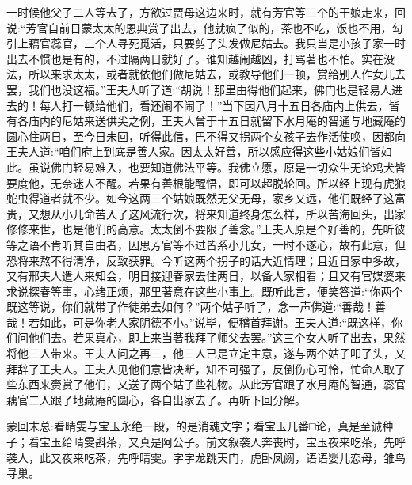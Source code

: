 \begin{parag}
    一时候他父子二人等去了，方欲过贾母这边来时，就有芳官等三个的干娘走来，回说:“芳官自前日蒙太太的恩典赏了出去，他就疯了似的，茶也不吃，饭也不用，勾引上藕官蕊官，三个人寻死觅活，只要剪了头发做尼姑去。我只当是小孩子家一时出去不惯也是有的，不过隔两日就好了。谁知越闹越凶，打骂著也不怕。实在没法，所以来求太太，或者就依他们做尼姑去，或教导他们一顿，赏给别人作女儿去罢，我们也没这福。”王夫人听了道:“胡说！那里由得他们起来，佛门也是轻易人进去的！每人打一顿给他们，看还闹不闹了！”当下因八月十五日各庙内上供去，皆有各庙内的尼姑来送供尖之例，王夫人曾于十五日就留下水月庵的智通与地藏庵的圆心住两日，至今日未回，听得此信，巴不得又拐两个女孩子去作活使唤，因都向王夫人道:“咱们府上到底是善人家。因太太好善，所以感应得这些小姑娘们皆如此。虽说佛门轻易难入，也要知道佛法平等。我佛立愿，原是一切众生无论鸡犬皆要度他，无奈迷人不醒。若果有善根能醒悟，即可以超脱轮回。所以经上现有虎狼蛇虫得道者就不少。如今这两三个姑娘既然无父无母，家乡又远，他们既经了这富贵，又想从小儿命苦入了这风流行次，将来知道终身怎么样，所以苦海回头，出家修修来世，也是他们的高意。太太倒不要限了善念。”王夫人原是个好善的，先听彼等之语不肯听其自由者，因思芳官等不过皆系小儿女，一时不遂心，故有此意，但恐将来熬不得清净，反致获罪。今听这两个拐子的话大近情理；且近日家中多故，又有邢夫人遣人来知会，明日接迎春家去住两日，以备人家相看；且又有官媒婆来求说探春等事，心绪正烦，那里著意在这些小事上。既听此言，便笑答道:“你两个既这等说，你们就带了作徒弟去如何？”两个姑子听了，念一声佛道:“善哉！善哉！若如此，可是你老人家阴德不小。”说毕，便稽首拜谢。王夫人道:“既这样，你们问他们去。若果真心，即上来当著我拜了师父去罢。”这三个女人听了出去，果然将他三人带来。王夫人问之再三，他三人已是立定主意，遂与两个姑子叩了头，又拜辞了王夫人。王夫人见他们意皆决断，知不可强了，反倒伤心可怜，忙命人取了些东西来赍赏了他们，又送了两个姑子些礼物。从此芳官跟了水月庵的智通，蕊官藕官二人跟了地藏庵的圆心，各自出家去了。再听下回分解。
\end{parag}


\begin{parag}
    \begin{note}蒙回末总:看晴雯与宝玉永绝一段，的是消魂文字；看宝玉几番□论，真是至诚种子；看宝玉给晴雯斟茶，又真是阿公子。前文叙袭人奔丧时，宝玉夜来吃茶，先呼袭人，此又夜来吃茶，先呼晴雯。字字龙跳天门，虎卧凤阙，语语婴儿恋母，雏鸟寻巢。\end{note}
\end{parag}
